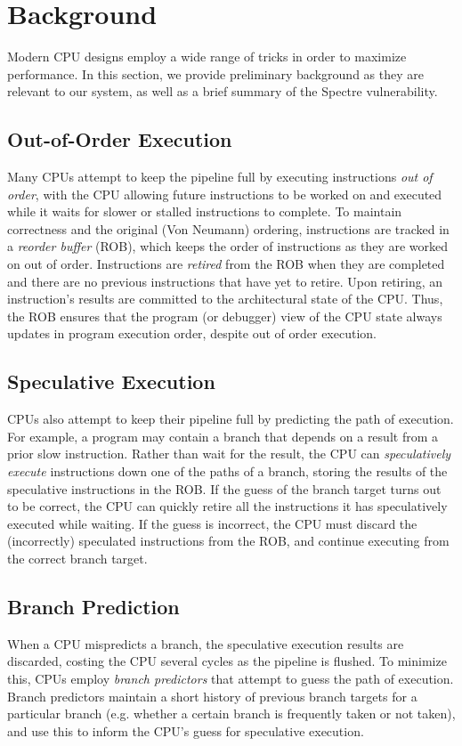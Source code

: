 
\section{Background}
Modern CPU designs employ a wide range of tricks in order to maximize
performance. In this section, we provide preliminary background as they are
relevant to our system, as well as a brief summary of the Spectre vulnerability.

\subsection{Out-of-Order Execution}
Many CPUs attempt to keep the pipeline full by executing instructions \emph{out of
order}, with the CPU allowing future instructions to be worked on and executed
while it waits for slower or stalled instructions to complete. To maintain
correctness and the original (Von Neumann) ordering, instructions are tracked in
a \emph{reorder buffer} (ROB), which keeps the order of instructions as they are
worked on out of order. Instructions are \emph{retired} from the ROB when
they are completed and there are no previous instructions that have yet to
retire. Upon retiring, an instruction's results are committed to the architectural
state of the CPU. Thus, the ROB ensures that the program (or debugger) view
of the CPU state always updates in program execution order, despite out of order
execution.

\subsection{Speculative Execution}

CPUs also attempt to keep their pipeline full by predicting the path of
execution. For example, a program may contain a branch that depends on a result
from a prior slow instruction. Rather than wait for the result, the CPU can
\emph{speculatively execute} instructions down one of the paths of a branch,
storing the results of the speculative instructions in the ROB.
If the guess of the branch target turns out to be correct, the CPU can quickly
retire all the instructions it has speculatively executed while waiting. If the
guess is incorrect, the CPU must discard the
(incorrectly) speculated instructions from the ROB, and continue executing from the
correct branch target.


\subsection{Branch Prediction}
When a CPU mispredicts a branch, the speculative execution results are
discarded, costing the CPU several cycles as the pipeline is flushed. To
minimize this, CPUs employ \emph{branch predictors} that attempt to guess the
path of execution. Branch predictors maintain a short history of previous
branch targets for a particular branch (e.g. whether a certain branch is
frequently taken or not taken), and use
this to inform the CPU's guess for speculative execution.

